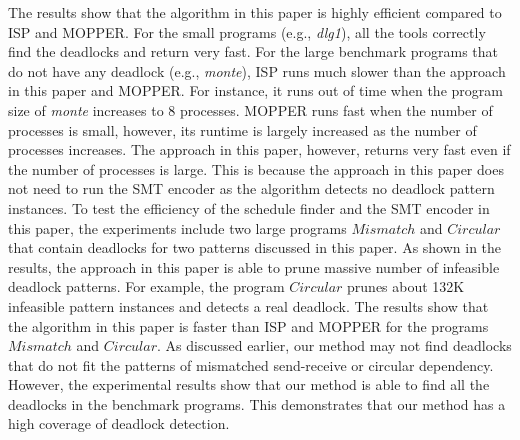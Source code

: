 The results show that the algorithm in this paper is highly efficient compared to ISP and MOPPER. For the small programs (e.g., \textit{dlg1}), all the tools correctly find the deadlocks and return very fast. For the large benchmark programs that do not have any deadlock (e.g., \textit{monte}), ISP runs much slower than the approach in this paper and MOPPER. For instance, it runs out of time when the program size of \textit{monte} increases to 8 processes. MOPPER runs fast when the number of processes is small, however, its runtime is largely increased as the number of processes increases. The approach in this paper, however, returns very fast even if the number of processes is large. This is because the approach in this paper does not need to run the SMT encoder as the algorithm detects no deadlock pattern instances. To test the efficiency of the schedule finder and the SMT encoder in this paper, the experiments include two large programs $\mathit{Mismatch}$ and $\mathit{Circular}$ that contain deadlocks for two patterns discussed in this paper. As shown in the results, the approach in this paper is able to prune massive number of infeasible deadlock patterns. For example, the program $\mathit{Circular}$ prunes about 132K infeasible pattern instances and detects a real deadlock. The results show that the algorithm in this paper is faster than ISP and MOPPER for the programs $\mathit{Mismatch}$ and $\mathit{Circular}$. As discussed earlier, our method may not find deadlocks that do not fit the patterns of mismatched send-receive or circular dependency. However, the experimental results show that our method is able to find all the deadlocks in the benchmark programs. This demonstrates that our method has a high coverage of deadlock detection. 

